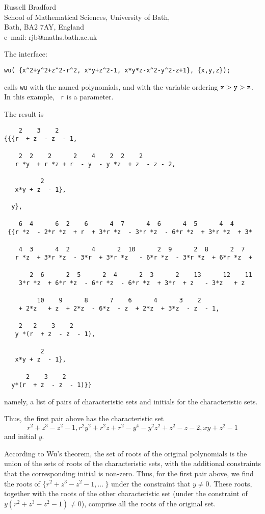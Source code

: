 \documentclass[11pt,letterpaper]{book}
\makeatletter
\newcommand{\underscore}{\_}
\newcommand{\ttindex}[1]{{\renewcommand{\_}{\protect\underscore}%
                          \index{#1@{\tt #1}}}}
\makeatother
\begin{document}
{\footnotesize
\begin{center}
Russell Bradford \\
School of Mathematical Sciences, University of Bath,\\
Bath, BA2 7AY, England \\[0.05in]
e--mail: rjb@maths.bath.ac.uk
\end{center}
}
\ttindex{WU}

The interface:
{\small\begin{verbatim}
wu( {x^2+y^2+z^2-r^2, x*y+z^2-1, x*y*z-x^2-y^2-z+1}, {x,y,z});
\end{verbatim}}
calls {\tt wu}\ttindex{WU} with the named polynomials, and with the
variable ordering ${\tt x} > {\tt y} > {\tt z}$.  In this example, {\tt
r} is a parameter.

The result is
{\small\begin{verbatim}
    2    3    2
{{{r  + z  - z  - 1,

    2  2    2      2    4    2  2    2
   r *y  + r *z + r  - y  - y *z  + z  - z - 2,

          2
   x*y + z  - 1},

  y},

    6  4      6  2    6      4  7      4  6      4  5      4  4
 {{r *z  - 2*r *z  + r  + 3*r *z  - 3*r *z  - 6*r *z  + 3*r *z  + 3*

    4  3      4  2      4      2  10      2  9      2  8      2  7
   r *z  + 3*r *z  - 3*r  + 3*r *z   - 6*r *z  - 3*r *z  + 6*r *z  +

       2  6      2  5      2  4      2  3      2    13      12    11
    3*r *z  + 6*r *z  - 6*r *z  - 6*r *z  + 3*r  + z   - 3*z   + z

         10    9      8      7    6      4      3    2
    + 2*z   + z  + 2*z  - 6*z  - z  + 2*z  + 3*z  - z  - 1,

    2   2    3    2
   y *(r  + z  - z  - 1),

          2
   x*y + z  - 1},

      2    3    2
  y*(r  + z  - z  - 1)}}
\end{verbatim}}
namely, a list of pairs of characteristic sets and initials for the
characteristic sets.

Thus, the first pair above has the characteristic set
$$ r^2 + z^3 - z^2 - 1,
r^2 y^2 + r^2 z + r^2 - y^4 - y^2 z^2 + z^2 - z - 2,
x y + z^2 - 1$$
and initial $y$.

According to Wu's theorem, the set of roots of the original polynomials
is the union of the sets of roots of the characteristic sets,
with the additional constraints that the corresponding initial is
non-zero.  Thus, for the first pair above, we find the roots of
 $\{r^2 + z^3 - z^2 - 1, \ldots~\}$ under the constraint that $y \neq 0$.
These roots, together with the roots of the other characteristic set
(under the constraint of $y(r^2+z^3-z^2-1) \neq 0$), comprise all the
roots of the original set.
\end{document}
